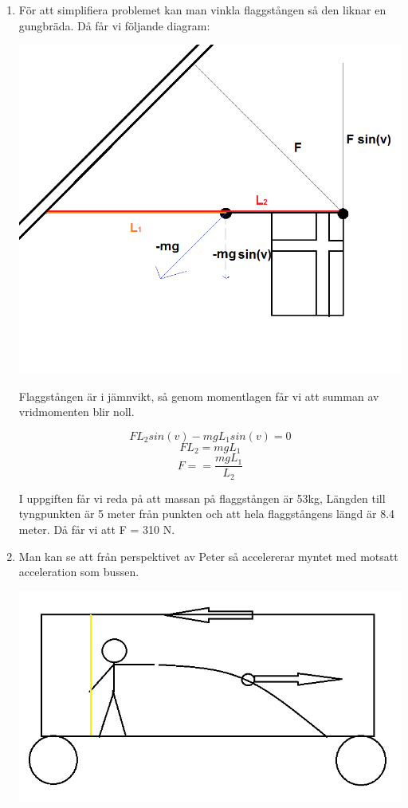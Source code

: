 \documentclass[a4paper,12pt]{article}
\begin{document}
\begin{enumerate}
    \item
          För att simplifiera problemet kan man vinkla flaggstången så den liknar
          en gungbräda. Då får vi följande diagram:

          \includegraphics[scale=0.55]{Figur2.png}

          Flaggstången är i jämnvikt, så genom momentlagen får vi att summan av vridmomenten
          blir noll.

          $$FL_2sin(v)-mgL_1sin(v)=0$$
          $$FL_2=mgL_1$$
          $$F==\frac{mgL_1}{L_2}$$

          I uppgiften får vi reda på att massan på flaggstången är 53kg, Längden till
          tyngpunkten är 5 meter från punkten och att hela flaggstångens längd
          är 8.4 meter. Då får vi att F = 310 N.

    \item

          Man kan se att från perspektivet av Peter så accelererar myntet
          med motsatt acceleration som bussen.

          \includegraphics[scale=0.5]{Figur3.png}


\end{enumerate}
\end{document}

